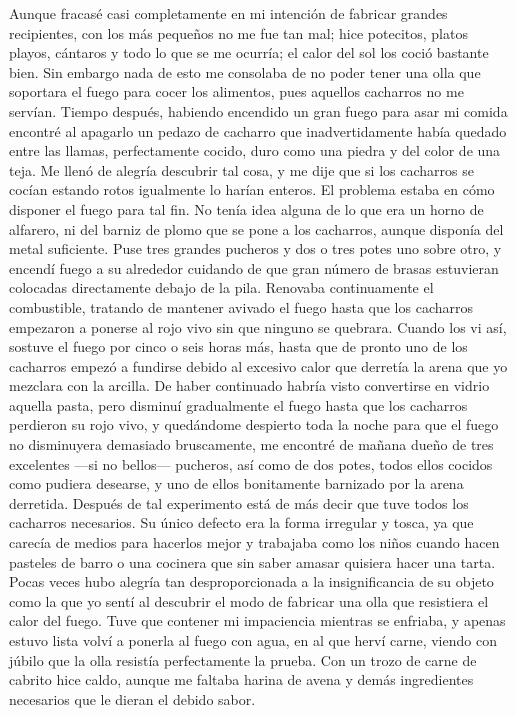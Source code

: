 \documentclass{novela}
\begin{document}
    Aunque fracasé casi completamente en mi intención de fabricar grandes recipientes, con los más pequeños no me fue tan mal; hice potecitos, platos playos, cántaros y todo lo que se me ocurría; el calor del sol los coció bastante bien. Sin embargo nada de esto me consolaba de no poder tener una olla que soportara el fuego para cocer los alimentos, pues aquellos cacharros no me servían. Tiempo después, habiendo encendido un gran fuego para asar mi comida encontré al apagarlo un pedazo de cacharro que inadvertidamente había quedado entre las llamas, perfectamente cocido, duro como una piedra y del color de una teja. Me llenó de alegría descubrir tal cosa, y me dije que si los cacharros se cocían estando rotos igualmente lo harían enteros. El problema estaba en cómo disponer el fuego para tal fin. No tenía idea alguna de lo que era un horno de alfarero, ni del barniz de plomo que se pone a los cacharros, aunque disponía del metal suficiente. Puse tres grandes pucheros y dos o tres potes uno sobre otro, y encendí fuego a su alrededor cuidando de que gran número de brasas estuvieran colocadas directamente debajo de la pila. Renovaba continuamente el combustible, tratando de mantener avivado el fuego hasta que los cacharros empezaron a ponerse al rojo vivo sin que ninguno se quebrara. Cuando los vi así, sostuve el fuego por cinco o seis horas más, hasta que de pronto uno de los cacharros empezó a fundirse debido al excesivo calor que derretía la arena que yo mezclara con la arcilla. De haber continuado habría visto convertirse en vidrio aquella pasta, pero disminuí gradualmente el fuego hasta que los cacharros perdieron su rojo vivo, y quedándome despierto toda la noche para que el fuego no disminuyera demasiado bruscamente, me encontré de mañana dueño de tres excelentes —si no bellos— pucheros, así como de dos potes, todos ellos cocidos como pudiera desearse, y uno de ellos bonitamente barnizado por la arena derretida.
    Después de tal experimento está de más decir que tuve todos los cacharros necesarios. Su único defecto era la forma irregular y tosca, ya que carecía de medios para hacerlos mejor y trabajaba como los niños cuando hacen pasteles de barro o una cocinera que sin saber amasar quisiera hacer una tarta. Pocas veces hubo alegría tan desproporcionada a la insignificancia de su objeto como la que yo sentí al descubrir el modo de fabricar una olla que resistiera el calor del fuego. Tuve que contener mi impaciencia mientras se enfriaba, y apenas estuvo lista volví a ponerla al fuego con agua, en al que herví carne, viendo con júbilo que la olla resistía perfectamente la prueba. Con un trozo de carne de cabrito hice caldo, aunque me faltaba harina de avena y demás ingredientes necesarios que le dieran el debido sabor.
\end{document}
